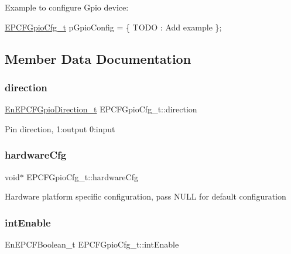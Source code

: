 Example to configure Gpio device\+:

\mbox{\hyperlink{structEPCFGpioCfg__t}{E\+P\+C\+F\+Gpio\+Cfg\+\_\+t}} p\+Gpio\+Config = \{ T\+O\+DO \+: Add example \}; 

\subsection{Member Data Documentation}
\mbox{\label{structEPCFGpioCfg__t_a74d5d67d533e9c0a1131fda88e22efe7}} 
\subsubsection{\texorpdfstring{direction}{direction}}
{\footnotesize\ttfamily \mbox{\hyperlink{gpio_8h_acfac25969bd9ca852e4a8293fccf01b1}{En\+E\+P\+C\+F\+Gpio\+Direction\+\_\+t}} E\+P\+C\+F\+Gpio\+Cfg\+\_\+t\+::direction}

Pin direction, 1\+:output 0\+:input \mbox{\label{structEPCFGpioCfg__t_a8f6ac9e3b552904645605c80ce445e3f}} 
\subsubsection{\texorpdfstring{hardware\+Cfg}{hardwareCfg}}
{\footnotesize\ttfamily void$\ast$ E\+P\+C\+F\+Gpio\+Cfg\+\_\+t\+::hardware\+Cfg}

Hardware platform specific configuration, pass N\+U\+LL for default configuration \mbox{\label{structEPCFGpioCfg__t_a3ea1b8cf99f36c3ff8312b22d0fa3266}} 
\subsubsection{\texorpdfstring{int\+Enable}{intEnable}}
{\footnotesize\ttfamily En\+E\+P\+C\+F\+Boolean\+\_\+t E\+P\+C\+F\+Gpio\+Cfg\+\_\+t\+::int\+Enable}

